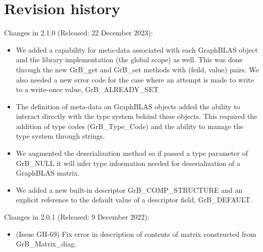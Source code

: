 \chapter{Revision history}
\label{Chp:RevHistory}

Changes in 2.1.0 (Released: 22 December 2023):    %
\begin{itemize}
\item We added a capability for meta-data associated with each GraphBLAS object and the
library implementation (the global scope) as well.   This was done through the new
{\sf GrB\_get} and {\sf GrB\_set} methods with {({\sf feild}, {\sf value})} pairs.  We also needed
 a new error code for the case where an attempt is made to write to a write-once value,
{\sf GrB\_ALREADY\_SET}  

\item The definition of meta-data on GraphBLAS objects added the ability to interact directly with 
the type system behind these objects.  This required the addition of type codes ({\sf GrB\_Type\_Code})
and the ability to manage the type system through strings.

\item We augmented the deserialization method so if passed a type parameter of {\sf GrB\_NULL}
it will infer type information needed for deserialization of a GraphBLAS matrix.

\item We added a new built-in descriptor  {\sf GrB\_COMP\_STRUCTURE} and an explicit reference
to the default value of a descriptor field, {\sf GrB\_DEFAULT}.

\end{itemize}


Changes in 2.0.1 (Released: 9 December 2022):    %
\begin{itemize}
\item (Issue GH-69) Fix error in description of contents of matrix constructed from {\sf GrB\_Matrix\_diag}.
\end{itemize}
 
